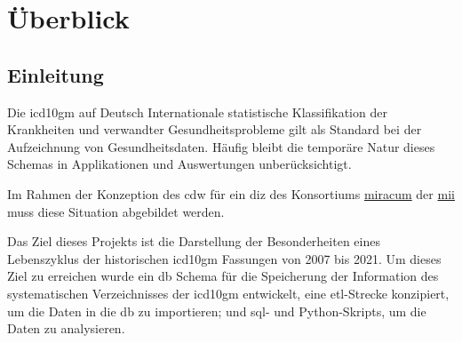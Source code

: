 \chapter{Überblick} \label{ch:introduction}

 \section{Einleitung} \label{sec:einl}

	Die \ac{icd10gm} auf Deutsch Internationale statistische Klassifikation der Krankheiten und  verwandter Gesundheitsprobleme gilt als Standard bei der Aufzeichnung von Gesundheitsdaten. Häufig bleibt die temporäre Natur dieses Schemas in Applikationen und Auswertungen unberücksichtigt.
	
	Im Rahmen der Konzeption des \ac{cdw} für ein  \ac{diz} des Konsortiums \href{https://www.miracum.org/}{\ac{miracum}} der \href{https://www.medizininformatik-initiative.de/de}{\ac{mii}} muss diese Situation abgebildet werden.
	
	Das Ziel dieses Projekts ist die Darstellung der Besonderheiten eines Lebenszyklus der historischen \ac{icd10gm} Fassungen von 2007 bis 2021. Um dieses Ziel zu erreichen wurde ein \ac{db} Schema für die Speicherung der Information des systematischen Verzeichnisses der \ac{icd10gm} entwickelt, eine \ac{etl}-Strecke konzipiert, um die Daten in die \ac{db} zu importieren; und \ac{sql}- und Python-Skripts, um die Daten zu analysieren.
